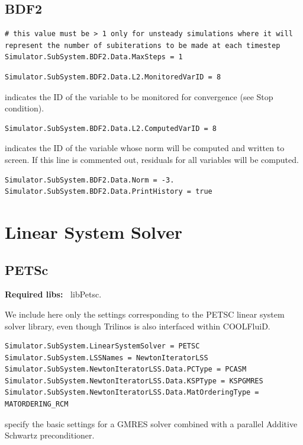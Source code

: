 \documentclass[11pt]{article}
\begin{document}
\subsection{BDF2}

\begin{lstlisting}[breaklines]
# this value must be > 1 only for unsteady simulations where it will represent the number of subiterations to be made at each timestep
Simulator.SubSystem.BDF2.Data.MaxSteps = 1
\end{lstlisting}

\begin{lstlisting}[breaklines]
Simulator.SubSystem.BDF2.Data.L2.MonitoredVarID = 8
\end{lstlisting}
indicates the ID of the variable to be monitored for convergence (see Stop condition). 
\begin{lstlisting}[breaklines]
Simulator.SubSystem.BDF2.Data.L2.ComputedVarID = 8 
\end{lstlisting}
indicates the ID of the variable whose norm will be computed and written to screen. If this line is commented out, residuals 
for all variables will be computed.

\begin{lstlisting}[breaklines]
Simulator.SubSystem.BDF2.Data.Norm = -3.
Simulator.SubSystem.BDF2.Data.PrintHistory = true
\end{lstlisting}

\section{Linear System Solver} \label{sec:LSS}

\subsection{PETSc}

{\bf Required libs:~} libPetsc.

We include here only the settings corresponding to the PETSC linear system solver library,
even though Trilinos is also interfaced within COOLFluiD.

\begin{lstlisting}[breaklines]
Simulator.SubSystem.LinearSystemSolver = PETSC
Simulator.SubSystem.LSSNames = NewtonIteratorLSS
Simulator.SubSystem.NewtonIteratorLSS.Data.PCType = PCASM
Simulator.SubSystem.NewtonIteratorLSS.Data.KSPType = KSPGMRES
Simulator.SubSystem.NewtonIteratorLSS.Data.MatOrderingType = MATORDERING_RCM
\end{lstlisting}
specify the basic settings for a GMRES solver combined with a parallel Additive Schwartz preconditioner.
\end{document}
